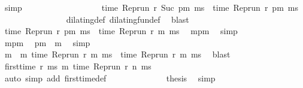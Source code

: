 \begin{isabellebody}
\ simp\ \isanewline
\ \ \ \ \ \ \ \ \ \ \ \ \isamarkupfalse%
\ {\isacharasterisk}\ \ \isamarkupfalse%
\ {\isacartoucheopen}time\ {\isacharparenleft}Rep{\isacharunderscore}run\ r\ {\isacharparenleft}Suc\ pm{\isacharparenright}\ ms{\isacharparenright}\ {\isacharequal}\ time\ {\isacharparenleft}Rep{\isacharunderscore}run\ r\ pm\ ms{\isacharparenright}{\isacartoucheclose}\isanewline
\ \ \ \ \ \ \ \ \ \ \ \ \ \ \isamarkupfalse%
\ dilating{\isacharunderscore}def\ dilating{\isacharunderscore}fun{\isacharunderscore}def\ \isamarkupfalse%
\ blast\isanewline
\ \ \ \ \ \ \ \ \ \ \ \ \isamarkupfalse%
\ {\isacartoucheopen}time\ {\isacharparenleft}Rep{\isacharunderscore}run\ r\ pm\ ms{\isacharparenright}\ {\isacharequal}\ time\ {\isacharparenleft}Rep{\isacharunderscore}run\ r\ m\ ms{\isacharparenright}{\isacartoucheclose}\ \isamarkupfalse%
\ mpm\ \isamarkupfalse%
\ simp\isanewline
\ \ \ \ \ \ \ \ \ \ \ \ \isamarkupfalse%
\ \isamarkupfalse%
\ mpm\ \isamarkupfalse%
\ {\isacartoucheopen}pm\ {\isacharless}\ m{\isacartoucheclose}\ \isamarkupfalse%
\ simp\isanewline
\ \ \ \ \ \ \ \ \ \ \ \ \isamarkupfalse%
\ \isamarkupfalse%
\ {\isacartoucheopen}{\isasymexists}m{\isacharprime}\ {\isacharless}\ m{\isachardot}\ time\ {\isacharparenleft}Rep{\isacharunderscore}run\ r\ m{\isacharprime}\ ms{\isacharparenright}\ {\isacharequal}\ time\ {\isacharparenleft}Rep{\isacharunderscore}run\ r\ m\ ms{\isacharparenright}{\isacartoucheclose}\ \isamarkupfalse%
\ blast\isanewline
\ \ \ \ \ \ \ \ \ \ \ \ \isamarkupfalse%
\ {\isacartoucheopen}{\isasymnot}{\isacharparenleft}first{\isacharunderscore}time\ r\ ms\ m\ {\isacharparenleft}time\ {\isacharparenleft}Rep{\isacharunderscore}run\ r\ n\ ms{\isacharparenright}\ {\isacharplus}\ {\isasymdelta}{\isasymtau}{\isacharparenright}{\isacharparenright}{\isacartoucheclose}\isanewline
\ \ \ \ \ \ \ \ \ \ \ \ \ \ \isamarkupfalse%
\ {\isacharparenleft}auto\ simp\ add{\isacharcolon}\ first{\isacharunderscore}time{\isacharunderscore}def{\isacharparenright}\isanewline
\ \ \ \ \ \ \ \ \ \ \ \ \isamarkupfalse%
\ {\isacharquery}thesis\ \isamarkupfalse%
\ simp\isanewline
\ \ \ \ \ \ \ \ \ \ \isamarkupfalse%
\isanewline
\ \ \ \ \ \ \ \ \isamarkupfalse%
\isanewline
\ \ \ \ \ \ \isacommand{{\isacharbraceright}}\isamarkupfalse%
\ \isamarkupfalse%

\end{isabellebody}
